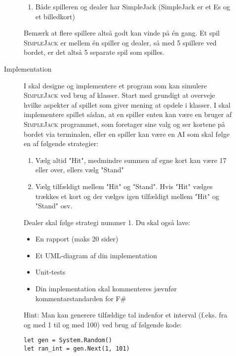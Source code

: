 \documentclass[a4paper,12pt]{article}
\newcommand{\sbl}{\textsc{SimpleJack }}
\begin{document}
\begin{description}
\begin{description}
\begin{enumerate}
    \item Både spilleren og dealer har SimpleJack (SimpleJack er et Es og et billedkort)
    \end{enumerate}
    Bemærk at flere spillere altså godt kan vinde på én gang. Et spil \sbl er mellem én spiller og dealer, 
    så med 5 spillere ved bordet, er det altså 5 separate spil som spilles.
  \item[Implementation]
    I skal designe og implementere et program som kan simulere \sbl ved brug af klasser. 
    Start med grundigt at overveje hvilke aspekter af spillet
    som giver mening at opdele i klasser. I skal implementere spillet sådan, at en spiller enten kan være en bruger af
    \sbl programmet, som foretager sine valg og ser kortene på bordet via terminalen, eller en spiller kan være en AI som
    skal følge en af følgende strategier:
    \begin{enumerate}
    \item Vælg altid "Hit", medmindre summen af egne kort kan være 17 eller over, ellers vælg "Stand"
    \item Vælg tilfældigt mellem "Hit" og "Stand". Hvis "Hit" vælges trækkes et kort og der vælges igen tilfældigt mellem "Hit"
      og "Stand" osv.
    \end{enumerate}
    Dealer skal følge strategi nummer 1.
    Du skal også lave:
    \begin{itemize}
    \item En rapport (maks 20 sider)
    \item Et UML-diagram af din implementation
    \item Unit-tests
    \item Din implementation skal kommenteres jævnfør kommentarstandarden for F\#
    \end{itemize}
    Hint: Man kan generere tilfældige tal indenfor et interval (f.eks. fra og med 1 til og med 100) ved brug af følgende kode:
\begin{lstlisting}[frame=none]
let gen = System.Random()
let ran_int = gen.Next(1, 101)
\end{lstlisting}
  \end{description}
\end{description}
\end{document}
